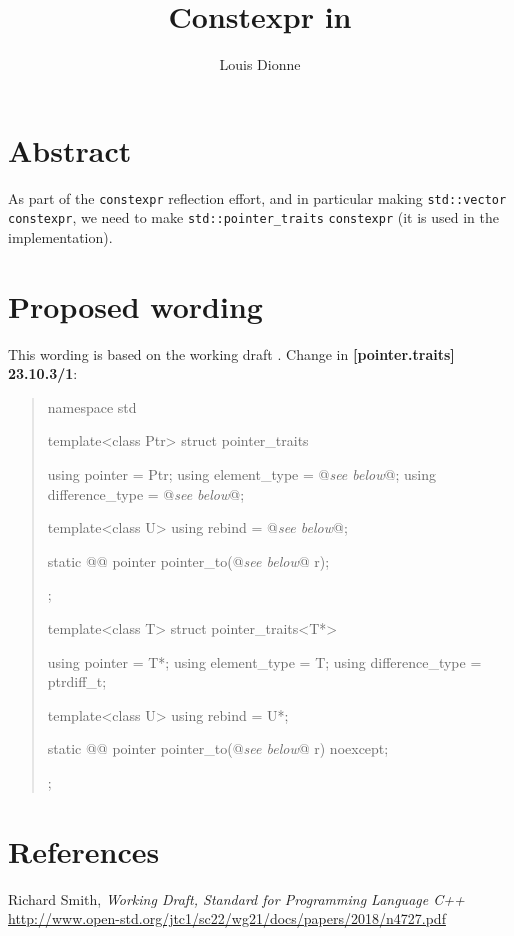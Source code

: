 \documentclass{wg21}
\title{Constexpr in \cc{std::pointer_traits}}
\author{Louis Dionne}{ldionne.2@gmail.com}
\newcommand{\cc}[1]{\texttt{#1}}
\begin{document}
\maketitle

\section{Abstract}
As part of the \cc{constexpr} reflection effort, and in particular making
\cc{std::vector} \cc{constexpr}, we need to make \cc{std::pointer_traits}
\cc{constexpr} (it is used in the implementation).


\section{Proposed wording}
This wording is based on the working draft \cite{N4727}.
Change in \textbf{[pointer.traits] 23.10.3/1}:

\begin{quote}
\begin{codeblock}
namespace std {
  template<class Ptr> struct pointer_traits {
    using pointer         = Ptr;
    using element_type    = @\textit{see below}@;
    using difference_type = @\textit{see below}@;

    template<class U> using rebind = @\textit{see below}@;

    static @@ pointer pointer_to(@\textit{see below}@ r);
  };

  template<class T> struct pointer_traits<T*> {
    using pointer         = T*;
    using element_type    = T;
    using difference_type = ptrdiff_t;

    template<class U> using rebind = U*;

    static @@ pointer pointer_to(@\textit{see below}@ r) noexcept;
  };
}
\end{codeblock}
\end{quote}



\section{References}
\renewcommand{\section}[2]{}%
\begin{thebibliography}{9}

  Richard Smith,
  \emph{Working Draft, Standard for Programming Language C++}\newline
  \url{http://www.open-std.org/jtc1/sc22/wg21/docs/papers/2018/n4727.pdf}

\end{thebibliography}
\end{document}
